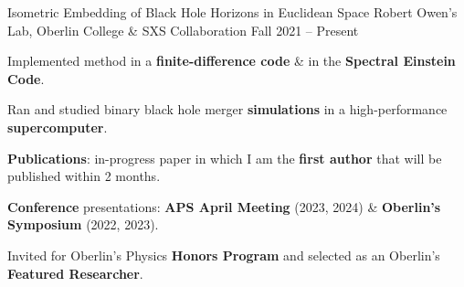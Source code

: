 \begin{entry}{Isometric Embedding of Black Hole Horizons in Euclidean Space}
	\entryItem
		{Robert Owen's Lab, Oberlin College \& SXS Collaboration}
		{Fall 2021 -- Present}

		\begin{items}
			\item Implemented method in a \textbf{finite-difference code} \hspace*{-0.1cm}\hspace*{-0.1cm} \& in the \textbf{Spectral Einstein Code}.
			\item Ran and studied binary black hole merger \textbf{simulations} in a high-performance \textbf{supercomputer}.
			\item \textbf{Publications}: in-progress paper in which I am the \textbf{first author} that will be published within 2 months.
			\item \textbf{Conference} presentations: \textbf{APS April Meeting} (2023, 2024) \& \textbf{Oberlin's Symposium} (2022, 2023).
			\item Invited for Oberlin's Physics \textbf{Honors Program} and selected as an Oberlin's \textbf{Featured Researcher}.
		\end{items}
\end{entry}
